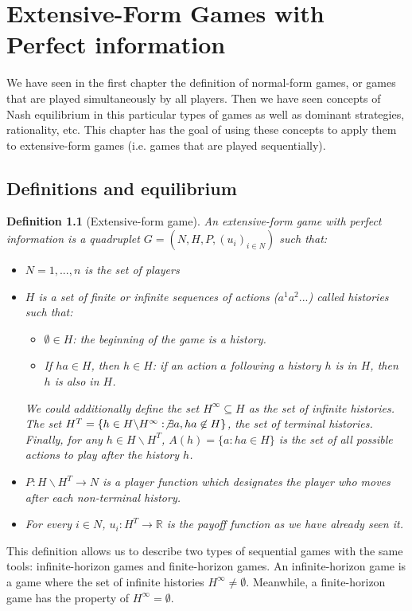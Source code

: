 \documentclass[12pt]{report}
\newtheorem{definition}{Definition}[chapter]
\begin{document}
\chapter{Extensive-Form Games with Perfect information}

We have seen in the first chapter the definition of normal-form games, or games that are played simultaneously by all players. Then we have seen concepts of Nash equilibrium in this particular types of games as well as dominant strategies, rationality, etc. This chapter has the goal of using these concepts to apply them to extensive-form games (i.e. games that are played sequentially).

\section{Definitions and equilibrium}

\begin{definition}[Extensive-form game]
An extensive-form game with perfect information is a quadruplet $G = (N, H, P, (u_i)_{i\in N})$ such that:\begin{itemize}
\item $N = {1, ..., n}$ is the set of players
\item $H$ is a set of finite or infinite sequences of actions ($a^1a^2 ...$) called histories such that:\begin{itemize}
\item $\emptyset \in H$: the beginning of the game is a history.
\item If $ha\in H$, then $h\in H$: if an action $a$ following a history $h$ is in $H$, then $h$ is also in $H$.
\end{itemize}
We could additionally define the set $H^\infty\subseteq H$ as the set of infinite histories. The set $H^T = \{h \in H\backslash H^\infty : \not\exists a, ha\not\in H\}$, the set of terminal histories. Finally, for any $h\in H\backslash H^T$, $A(h) = \{a : ha\in H\}$ is the set of all possible actions to play after the history $h$.
\item $P: H\backslash H^T \to N$ is a player function which designates the player who moves after each non-terminal history.
\item For every $i\in N$, $u_i:H^T\to \mathbb{R}$ is the payoff function as we have already seen it.
\end{itemize}
\end{definition}

This definition allows us to describe two types of sequential games with the same tools: infinite-horizon games and finite-horizon games. An infinite-horizon game is a game where the set of infinite histories $H^\infty \neq \emptyset$. Meanwhile, a finite-horizon game has the property of $H^\infty = \emptyset$.
\end{document}

